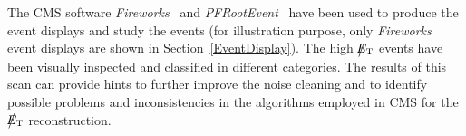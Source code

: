 The CMS software {\it Fireworks}~\cite{FireworksLink} and {\it PFRootEvent}~\cite{PFRootEventLink} 
have been used to produce the event displays and study the events (for illustration purpose, 
only {\it Fireworks} event displays are shown in Section~\ref{EventDisplay}). 
The high $\big\slash\hspace{-1.6ex}{E_\text{T}}$ events have been visually inspected and classified in different 
categories. The results of this scan can provide hints to further improve the noise 
cleaning and to identify possible problems and inconsistencies in the algorithms employed 
in CMS for the $\big\slash\hspace{-1.6ex}{E_\text{T}}$ reconstruction.

